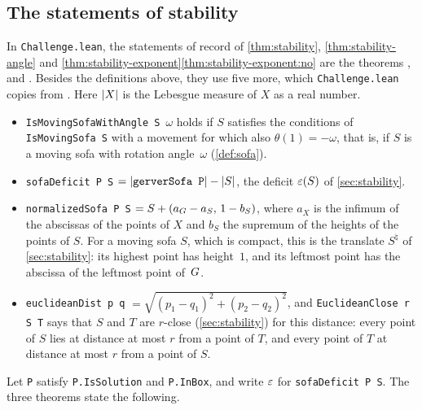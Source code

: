 \subsection{The statements of stability}\label{app:lean-stability}

In \texttt{Challenge.lean}, the statements of record of \cref{thm:stability},
\cref{thm:stability-angle} and
\cref{thm:stability-exponent}\ref{thm:stability-exponent:no} are the theorems
,  and
. Besides the definitions above, they
use five more, which \texttt{Challenge.lean} copies from
. Here $\lvert X\rvert$ is the Lebesgue measure of $X$ as a
real number.
\begin{itemize}
\item \texttt{IsMovingSofaWithAngle S}~$\omega$ holds if $S$ satisfies the
conditions of \texttt{IsMovingSofa S} with a movement for which also
$\theta(1)=-\omega$, that is, if $S$ is a moving sofa with rotation
angle~$\omega$ (\cref{def:sofa}).
\item \texttt{sofaDeficit P S} $=\lvert \texttt{gerverSofa P}\rvert-\lvert S\rvert$, the
deficit $\varepsilon(S)$ of \cref{sec:stability}.
\item \texttt{normalizedSofa P S} $=S+(a_{G}-a_S,\,1-b_S)$, where $a_X$ is the
infimum of the abscissas of the points of $X$ and $b_S$ the supremum of the
heights of the points of $S$. For a moving sofa $S$, which is compact, this is
the translate $S^\natural$ of \cref{sec:stability}: its highest point has
height~$1$, and its leftmost point has the abscissa of the leftmost point
of~$G$.
\item \texttt{euclideanDist p q} $=\sqrt{(p_1-q_1)^2+(p_2-q_2)^2}$, and
\texttt{EuclideanClose r S T} says that $S$ and $T$ are $r$-close
(\cref{sec:stability}) for this distance: every point of $S$ lies at distance at
most $r$ from a point of $T$, and every point of $T$ at distance at most $r$
from a point of $S$.
\end{itemize}
Let \texttt{P} satisfy \texttt{P.IsSolution} and \texttt{P.InBox}, and write
$\varepsilon$ for \texttt{sofaDeficit P S}. The three theorems state the following.
